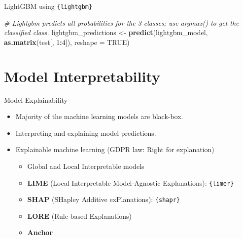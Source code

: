 \documentclass[12pt,ignorenonframetext,]{beamer}
\newenvironment{Shaded}{\begin{snugshade}}{\end{snugshade}}
\newcommand{\CommentTok}[1]{\textcolor[rgb]{0.56,0.35,0.01}{\textit{#1}}}
\newcommand{\DataTypeTok}[1]{\textcolor[rgb]{0.13,0.29,0.53}{#1}}
\newcommand{\DecValTok}[1]{\textcolor[rgb]{0.00,0.00,0.81}{#1}}
\newcommand{\KeywordTok}[1]{\textcolor[rgb]{0.13,0.29,0.53}{\textbf{#1}}}
\newcommand{\NormalTok}[1]{#1}
\newcommand{\OperatorTok}[1]{\textcolor[rgb]{0.81,0.36,0.00}{\textbf{#1}}}
\newcommand{\OtherTok}[1]{\textcolor[rgb]{0.56,0.35,0.01}{#1}}
\newcommand{\StringTok}[1]{\textcolor[rgb]{0.31,0.60,0.02}{#1}}
\providecommand{\tightlist}{%
  \setlength{\itemsep}{0pt}\setlength{\parskip}{0pt}}
\begin{document}
\begin{frame}[fragile]{LightGBM using \texttt{\{lightgbm\}}}
\begin{Shaded}
\begin{Highlighting}[]
\CommentTok{# Lightgbm predicts all probabilities for the 3 classes; use argmax() to get the classified class.}
\NormalTok{lightgbm_predictions <-}\StringTok{ }\KeywordTok{predict}\NormalTok{(lightgbm_model, }\KeywordTok{as.matrix}\NormalTok{(test[, }\DecValTok{1}\OperatorTok{:}\DecValTok{4}\NormalTok{]), }\DataTypeTok{reshape =} \OtherTok{TRUE}\NormalTok{)}
\end{Highlighting}
\end{Shaded}

\normalsize

\end{frame}

\hypertarget{model-interpretability}{%
\section{Model Interpretability}\label{model-interpretability}}

\begin{frame}{Model Explainability}
\protect\hypertarget{model-explainability}{}

\begin{itemize}
\tightlist
\item
  Majority of the machine learning models are black-box. \vspace{2mm}
\item
  Interpreting and explaining model predictions. \vspace{2mm}
\item
  Explainable machine learning (GDPR law: Right for explanation)
  \vspace{2mm}

  \begin{itemize}
      \item Global and Local Interpretable models
      \item \textbf{LIME} (Local Interpretable Model-Agnostic Explanations): \texttt{\{limer\}}
      \item \textbf{SHAP} (SHapley Additive exPlanations): \texttt{\{shapr\}}
      \item \textbf{LORE} (Rule-based Explanations)
      \item \textbf{Anchor}
  \end{itemize}
\end{itemize}

\end{frame}
\end{document}
